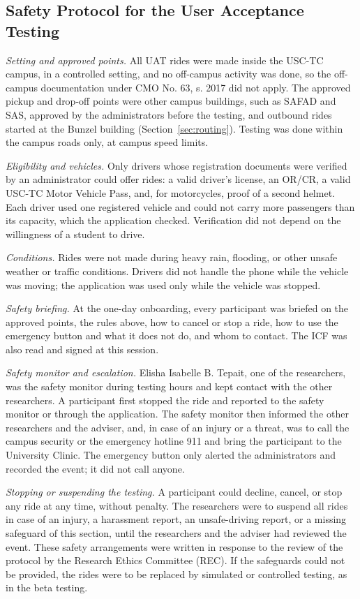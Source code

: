 \subsection[Safety Protocol for the User Acceptance Testing]{Safety Protocol for the User Acceptance Testing}\label{sec:uat-safety}
\textit{Setting and approved points.} All UAT rides were made inside the USC-TC campus, in a controlled setting, and no off-campus activity was done, so the off-campus documentation under CMO No. 63, s. 2017 did not apply. The approved pickup and drop-off points were other campus buildings, such as SAFAD and SAS, approved by the administrators before the testing, and outbound rides started at the Bunzel building (Section~\ref{sec:routing}). Testing was done within the campus roads only, at campus speed limits.

\textit{Eligibility and vehicles.} Only drivers whose registration documents were verified by an administrator could offer rides: a valid driver's license, an OR/CR, a valid USC-TC Motor Vehicle Pass, and, for motorcycles, proof of a second helmet. Each driver used one registered vehicle and could not carry more passengers than its capacity, which the application checked. Verification did not depend on the willingness of a student to drive.

\textit{Conditions.} Rides were not made during heavy rain, flooding, or other unsafe weather or traffic conditions. Drivers did not handle the phone while the vehicle was moving; the application was used only while the vehicle was stopped.

\textit{Safety briefing.} At the one-day onboarding, every participant was briefed on the approved points, the rules above, how to cancel or stop a ride, how to use the emergency button and what it does not do, and whom to contact. The ICF was also read and signed at this session.

\textit{Safety monitor and escalation.} Elisha Isabelle B. Tepait, one of the researchers, was the safety monitor during testing hours and kept contact with the other researchers. A participant first stopped the ride and reported to the safety monitor or through the application. The safety monitor then informed the other researchers and the adviser, and, in case of an injury or a threat, was to call the campus security or the emergency hotline 911 and bring the participant to the University Clinic. The emergency button only alerted the administrators and recorded the event; it did not call anyone.

\textit{Stopping or suspending the testing.} A participant could decline, cancel, or stop any ride at any time, without penalty. The researchers were to suspend all rides in case of an injury, a harassment report, an unsafe-driving report, or a missing safeguard of this section, until the researchers and the adviser had reviewed the event. These safety arrangements were written in response to the review of the protocol by the Research Ethics Committee (REC). If the safeguards could not be provided, the rides were to be replaced by simulated or controlled testing, as in the beta testing.

